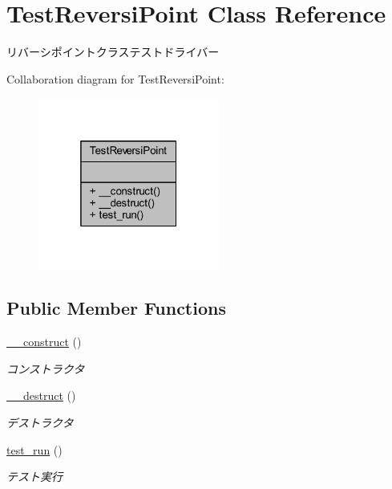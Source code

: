 \hypertarget{class_test_reversi_point}{}\section{Test\+Reversi\+Point Class Reference}
\label{class_test_reversi_point}


リバーシポイントクラステストドライバー  




Collaboration diagram for Test\+Reversi\+Point\+:\nopagebreak
\begin{figure}[H]
\begin{center}
\leavevmode
\includegraphics[width=169pt]{class_test_reversi_point__coll__graph}
\end{center}
\end{figure}
\subsection*{Public Member Functions}
\begin{DoxyCompactItemize}
\item 
\hyperlink{class_test_reversi_point_a095c5d389db211932136b53f25f39685}{\+\_\+\+\_\+construct} ()
\begin{DoxyCompactList}\small\item\em コンストラクタ \end{DoxyCompactList}\item 
\hyperlink{class_test_reversi_point_a421831a265621325e1fdd19aace0c758}{\+\_\+\+\_\+destruct} ()
\begin{DoxyCompactList}\small\item\em デストラクタ \end{DoxyCompactList}\item 
\hyperlink{class_test_reversi_point_a9b029832cfdf19c0ef36b1f5ef7b7735}{test\+\_\+run} ()
\begin{DoxyCompactList}\small\item\em テスト実行 \end{DoxyCompactList}\end{DoxyCompactItemize}


